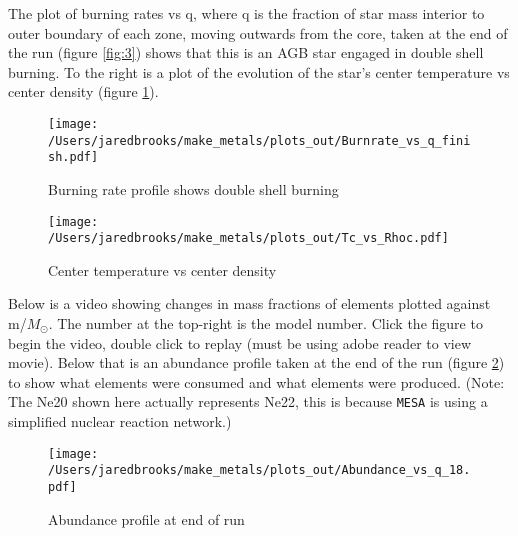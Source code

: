 \documentclass{article}
\begin{document}
        \pagebreak

        The plot of burning rates vs q, where q is the fraction of star mass interior to outer boundary of each zone, moving outwards from the core, taken at the end of the run (figure \ref{fig:3}) shows that this is an AGB star engaged in double shell burning. To the right is a plot of the evolution of the star's center temperature vs center density (figure \ref{fig:4}).

        \begin{figure}[H]
                \begin{minipage}[b]{0.5\linewidth}
                       \centering
                       \texttt{[image: /Users/jaredbrooks/make\_metals/plots\_out/Burnrate\_vs\_q\_finish.pdf]}
                       \caption{Burning rate profile shows double shell burning}
                       \label{fig:3}
                \end{minipage}
                \hspace{0cm}
                \begin{minipage}[b]{0.5\linewidth}
                       \centering
                       \texttt{[image: /Users/jaredbrooks/make\_metals/plots\_out/Tc\_vs\_Rhoc.pdf]}
                       \caption{Center temperature vs center density}
                       \label{fig:4}
                \end{minipage}
        \end{figure}

        \pagebreak

        Below is a video showing changes in mass fractions of elements plotted against m/$M_\odot$.  The number at the top-right is the model number.  Click the figure to begin the video, double click to replay (must be using adobe reader to view movie).  Below that is an abundance profile taken at the end of the run (figure \ref{fig:5}) to show what elements were consumed and what elements were produced.  (Note: The Ne20 shown here actually represents Ne22, this is because \texttt{MESA} is using a simplified nuclear reaction network.)

        \begin{figure}[H]
        \end{figure}

        \begin{figure}[H]
                \centering
                \texttt{[image: /Users/jaredbrooks/make\_metals/plots\_out/Abundance\_vs\_q\_18.pdf]}
                \caption{Abundance profile at end of run}
                \label{fig:5}
        \end{figure}
\end{document}
